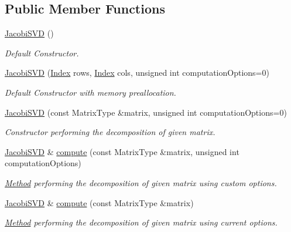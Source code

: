 \subsection*{Public Member Functions}
\begin{DoxyCompactItemize}
\item 
\mbox{\hyperlink{class_eigen_1_1_jacobi_s_v_d_a55315ab9cd060019a5ad07be798ff3b9}{Jacobi\+S\+VD}} ()
\begin{DoxyCompactList}\small\item\em Default Constructor. \end{DoxyCompactList}\item 
\mbox{\hyperlink{class_eigen_1_1_jacobi_s_v_d_a5d9ea7c8f361337727260efd77ee03ac}{Jacobi\+S\+VD}} (\mbox{\hyperlink{class_eigen_1_1_s_v_d_base_a6229a37997eca1072b52cca5ee7a2bec}{Index}} rows, \mbox{\hyperlink{class_eigen_1_1_s_v_d_base_a6229a37997eca1072b52cca5ee7a2bec}{Index}} cols, unsigned int computation\+Options=0)
\begin{DoxyCompactList}\small\item\em Default Constructor with memory preallocation. \end{DoxyCompactList}\item 
\mbox{\hyperlink{class_eigen_1_1_jacobi_s_v_d_abfd1dd454a6e3edec7feecd97c818a78}{Jacobi\+S\+VD}} (const Matrix\+Type \&matrix, unsigned int computation\+Options=0)
\begin{DoxyCompactList}\small\item\em Constructor performing the decomposition of given matrix. \end{DoxyCompactList}\item 
\mbox{\hyperlink{class_eigen_1_1_jacobi_s_v_d}{Jacobi\+S\+VD}} \& \mbox{\hyperlink{class_eigen_1_1_jacobi_s_v_d_a5dab376cc86cf0d36674bcdad4af3f5a}{compute}} (const Matrix\+Type \&matrix, unsigned int computation\+Options)
\begin{DoxyCompactList}\small\item\em \mbox{\hyperlink{struct_method}{Method}} performing the decomposition of given matrix using custom options. \end{DoxyCompactList}\item 
\mbox{\hyperlink{class_eigen_1_1_jacobi_s_v_d}{Jacobi\+S\+VD}} \& \mbox{\hyperlink{class_eigen_1_1_jacobi_s_v_d_acc7b9a4068cf7b69ae3227d217ed7efd}{compute}} (const Matrix\+Type \&matrix)
\begin{DoxyCompactList}\small\item\em \mbox{\hyperlink{struct_method}{Method}} performing the decomposition of given matrix using current options. \end{DoxyCompactList}\item 

\end{DoxyCompactItemize}
